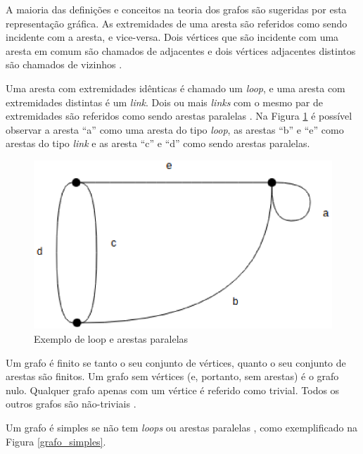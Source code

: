 A maioria das definições e conceitos na teoria dos grafos são sugeridas por esta representação gráfica. As extremidades de uma aresta são referidos como sendo incidente com a aresta, e vice-versa. Dois vértices que são incidente com uma aresta em comum são chamados de adjacentes e dois vértices adjacentes distintos são chamados de vizinhos \cite{Costa:2011}.

Uma aresta com extremidades idênticas é chamado um \textit{loop}, e uma aresta com extremidades distintas é um \textit{link}. Dois ou mais \textit{links} com o mesmo par de extremidades são referidos como sendo arestas paralelas \cite{Bondy:2007}. Na Figura \ref{loop_paralela} é possível observar a aresta ``a'' como uma aresta do tipo \textit{loop}, as arestas ``b'' e ``e'' como arestas do tipo \textit{link} e as aresta ``c'' e ``d'' como sendo arestas paralelas.

\begin{figure}[!h]
	\centering
	\includegraphics[scale=0.4]{figuras/capitulo2/loop_paralela.eps}
	\caption{Exemplo de loop e arestas paralelas}
	\label{loop_paralela}
\end{figure}

Um grafo é finito se tanto o seu conjunto de vértices, quanto o seu conjunto de arestas são finitos. Um grafo sem vértices (e, portanto, sem arestas) é o grafo nulo. Qualquer grafo apenas com um vértice é referido como trivial. Todos os outros grafos são não-triviais \cite{Costa:2011}.

Um grafo é simples se não tem \textit{loops} ou arestas paralelas \cite{Diestel:1997}, como exemplificado na Figura \ref{grafo_simples}.

